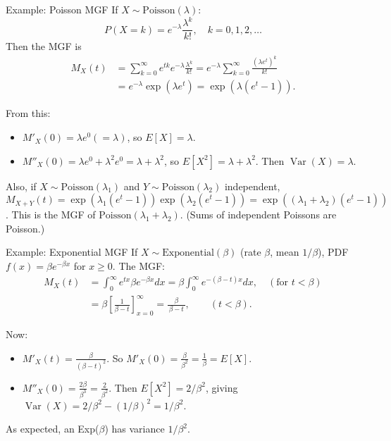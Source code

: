 \documentclass[aspectratio=169,11pt]{beamer} %
\begin{document}
\begin{frame}{Example: Poisson MGF}
If $X \sim \text{Poisson}(\lambda)$:
\[P(X=k) = e^{-\lambda}\frac{\lambda^k}{k!}, \quad k=0,1,2,\dots\]
Then the MGF is
\begin{align*}
M_X(t) &= \sum_{k=0}^\infty e^{t k} e^{-\lambda}\frac{\lambda^k}{k!} = e^{-\lambda} \sum_{k=0}^\infty \frac{(\lambda e^t)^k}{k!} \\
&= e^{-\lambda} \exp(\lambda e^t) = \exp(\lambda(e^t - 1)).
\end{align*}

From this:
\begin{itemize}
    \item $M'_X(0) = \lambda e^{0}(= \lambda)$, so $E[X]=\lambda$.
    \item $M''_X(0) = \lambda e^{0} + \lambda^2 e^{0} = \lambda + \lambda^2$, so $E[X^2] = \lambda + \lambda^2$. Then $\operatorname{Var}(X) = \lambda$. 
\end{itemize}
Also, if $X \sim \text{Poisson}(\lambda_1)$ and $Y \sim \text{Poisson}(\lambda_2)$ independent, $M_{X+Y}(t) = \exp(\lambda_1(e^t-1))\exp(\lambda_2(e^t-1)) = \exp((\lambda_1+\lambda_2)(e^t-1))$. This is the MGF of $\text{Poisson}(\lambda_1+\lambda_2)$. (Sums of independent Poissons are Poisson.)
\end{frame}

\begin{frame}{Example: Exponential MGF}
If $X \sim \text{Exponential}(\beta)$ (rate $\beta$, mean $1/\beta$), PDF $f(x) = \beta e^{-\beta x}$ for $x \ge 0$. \newline
The MGF:
\begin{align*}
M_X(t) &= \int_0^\infty e^{t x} \beta e^{-\beta x} dx 
= \beta \int_0^\infty e^{-(\beta - t)x} dx, \quad (\text{for }t<\beta) \\
&= \beta \left[\frac{1}{\beta - t}\right]_{x=0}^{\infty} 
= \frac{\beta}{\,\beta - t\,}, \qquad (t < \beta).
\end{align*}

Now:
\begin{itemize}
    \item $M'_X(t) = \frac{\beta}{(\beta - t)^2}$. So $M'_X(0) = \frac{\beta}{\beta^2} = \frac{1}{\beta} = E[X]$.
    \item $M''_X(0) = \frac{2\beta}{\beta^3} = \frac{2}{\beta^2}$. Then $E[X^2] = 2/\beta^2$, giving $\operatorname{Var}(X) = 2/\beta^2 - (1/\beta)^2 = 1/\beta^2$.
\end{itemize}
As expected, an Exp($\beta$) has variance $1/\beta^2$.
\end{frame}
\end{document}
